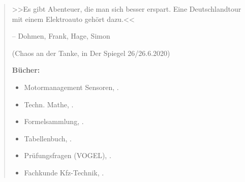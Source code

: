 \null\vfil
\begin{otherlanguage}{ngerman}
\begin{center}\textsf{\textbf{\abstractname}}\end{center}


    \begin{quote}
        \textcolor{rot5}{>>Es gibt Abenteuer, die man sich besser erspart. Eine Deutschlandtour mit einem Elektroauto gehört dazu.<<}\\ 
        \raggedleft \small{-- Dohmen, Frank, Hage, Simon
        
        (Chaos an der Tanke, in Der Spiegel 26/26.6.2020)}%
        
        \raggedright

        \textbf{Bücher:}

        \begin{itemize}         
            \item Motormanagement Sensoren, \textcite{schneehage:2021:motormanagement}.
            \item Techn. Mathe, \textcite{elbl:2016:technMa}.       
            \item Formelsammlung, \textcite{bell:2020:formelsammlung}.
            \item Tabellenbuch, \textcite{bell:2021:tabellenbuchKfz}.
            \item Prüfungsfragen (VOGEL), \textcite{schluter:2021:prufungsfragenKfz}.
            \item Fachkunde Kfz-Technik, \textcite{brand:2020:fachkundeKfz}.
        \end{itemize}


    \end{quote}

\end{otherlanguage}
\vfil\null




